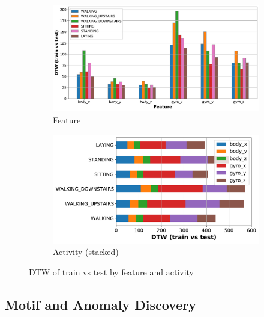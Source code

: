 \documentclass[10pt, a4paper, twocolumn]{article}
\begin{document}
\begin{figure}[h]
\centering
    \begin{subfigure}[t]{0.49\columnwidth}
        \includegraphics[width=\linewidth]{histo_feat.pdf}
        \caption{Feature}
        \label{fig:histofeat}
    \end{subfigure}
    \hfill%
    \begin{subfigure}[t]{0.48\columnwidth}
        \includegraphics[width=\linewidth]{histo_act.pdf}
        \caption{Activity (stacked)}
        \label{fig:histostacked}
    \end{subfigure}
\caption{DTW of train vs test by feature and activity}\label{histo}
\end{figure}

\subsection{Motif and Anomaly Discovery}
\end{document}
